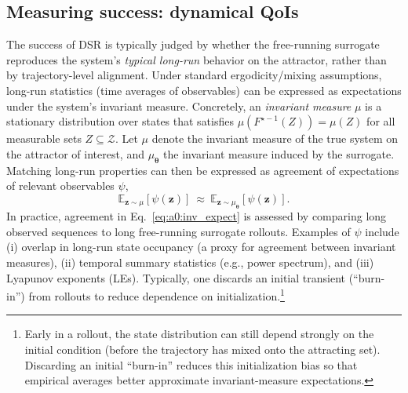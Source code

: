 \documentclass[twoside]{article}
\theoremstyle{plain}
\theoremstyle{definition}
\theoremstyle{remark}
\newcommand{\E}{\mathbb{E}}
\begin{document}
\subsection{Measuring success: dynamical QoIs}
The success of DSR is typically judged by whether the free-running surrogate reproduces the system's \emph{typical long-run} behavior on the attractor, rather than by trajectory-level alignment. Under standard ergodicity/mixing assumptions, long-run statistics (time averages of observables) can be expressed as expectations under the system's invariant measure. Concretely, an \emph{invariant measure} $\mu$ is a stationary distribution over states that satisfies $\mu(F^{\star -1}(Z))=\mu(Z)$ for all measurable sets $Z \subseteq \mathcal{Z}$. Let $\mu$ denote the invariant measure of the true system on the attractor of interest, and $\mu_{\bm\theta}$ the invariant measure induced by the surrogate. Matching long-run properties can then be expressed as agreement of expectations of relevant observables $\psi$,
\begin{equation}
\label{eq:a0:inv_expect}
\E_{\bm{z}\sim\mu}[\psi(\bm{z})]\ \approx\ \E_{\bm{z}\sim\mu_{\bm\theta}}[\psi(\bm{z})].
\end{equation}
In practice, agreement in Eq.~\eqref{eq:a0:inv_expect} is assessed by comparing long observed sequences to long free-running surrogate rollouts. Examples of $\psi$ include (i) overlap in long-run state occupancy (a proxy for agreement between invariant measures), (ii) temporal summary statistics (e.g., power spectrum), and (iii) Lyapunov exponents (LEs). Typically, one discards an initial transient (``burn-in'') from rollouts to reduce dependence on initialization.\footnote{Early in a rollout, the state distribution can still depend strongly on the initial condition (before the trajectory has mixed onto the attracting set). Discarding an initial ``burn-in'' reduces this initialization bias so that empirical averages better approximate invariant-measure expectations.}
\end{document}
